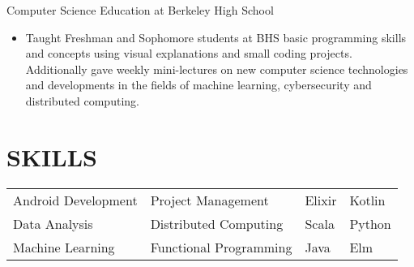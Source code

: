 \documentclass[10pt]{article}
\begin{document}
				Computer Science Education at Berkeley High School
			
				\begin{itemize}
					\item[] Taught Freshman and Sophomore students at BHS basic programming skills and concepts using visual explanations and small coding projects. Additionally gave weekly mini-lectures on new computer science technologies and developments in the fields of machine learning, cybersecurity and distributed computing.	
				\end{itemize}

\section*{SKILLS}
				\setlength{\columnsep}{1pt}
				\begin{tabu}{X[2c]X[2c]X[c]X[c]}
					Android Development  & Project Management & Elixir& Kotlin \\
					Data Analysis 			   & Distributed Computing & Scala & Python \\
					Machine Learning		   & Functional Programming & Java & Elm \\
				\end{tabu}
 
\end{document}
